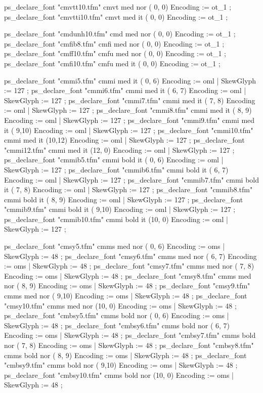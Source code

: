 {    ps_declare_font "cmvtt10.tfm"  cmvt med  nor ( 0, 0) { Encoding := ot_1 };
    ps_declare_font "cmvtti10.tfm" cmvt med  it  ( 0, 0) { Encoding := ot_1 };

    ps_declare_font "cmdunh10.tfm" cmd  med  nor ( 0, 0) { Encoding := ot_1 };
    ps_declare_font "cmfib8.tfm"   cmfi med  nor ( 0, 0) { Encoding := ot_1 };
    ps_declare_font "cmff10.tfm"   cmfu med  nor ( 0, 0) { Encoding := ot_1 };
    ps_declare_font "cmfi10.tfm"   cmfu med  it  ( 0, 0) { Encoding := ot_1 };

    ps_declare_font "cmmi5.tfm"    cmmi med  it  ( 0, 6) { Encoding := oml | SkewGlyph := 127 };
    ps_declare_font "cmmi6.tfm"    cmmi med  it  ( 6, 7) { Encoding := oml | SkewGlyph := 127 };
    ps_declare_font "cmmi7.tfm"    cmmi med  it  ( 7, 8) { Encoding := oml | SkewGlyph := 127 };
    ps_declare_font "cmmi8.tfm"    cmmi med  it  ( 8, 9) { Encoding := oml | SkewGlyph := 127 };
    ps_declare_font "cmmi9.tfm"    cmmi med  it  ( 9,10) { Encoding := oml | SkewGlyph := 127 };
    ps_declare_font "cmmi10.tfm"   cmmi med  it  (10,12) { Encoding := oml | SkewGlyph := 127 };
    ps_declare_font "cmmi12.tfm"   cmmi med  it  (12, 0) { Encoding := oml | SkewGlyph := 127 };
    ps_declare_font "cmmib5.tfm"   cmmi bold it  ( 0, 6) { Encoding := oml | SkewGlyph := 127 };
    ps_declare_font "cmmib6.tfm"   cmmi bold it  ( 6, 7) { Encoding := oml | SkewGlyph := 127 };
    ps_declare_font "cmmib7.tfm"   cmmi bold it  ( 7, 8) { Encoding := oml | SkewGlyph := 127 };
    ps_declare_font "cmmib8.tfm"   cmmi bold it  ( 8, 9) { Encoding := oml | SkewGlyph := 127 };
    ps_declare_font "cmmib9.tfm"   cmmi bold it  ( 9,10) { Encoding := oml | SkewGlyph := 127 };
    ps_declare_font "cmmib10.tfm"  cmmi bold it  (10, 0) { Encoding := oml | SkewGlyph := 127 };

    ps_declare_font "cmsy5.tfm"    cmms med  nor ( 0, 6) { Encoding := oms | SkewGlyph := 48 };
    ps_declare_font "cmsy6.tfm"    cmms med  nor ( 6, 7) { Encoding := oms | SkewGlyph := 48 };
    ps_declare_font "cmsy7.tfm"    cmms med  nor ( 7, 8) { Encoding := oms | SkewGlyph := 48 };
    ps_declare_font "cmsy8.tfm"    cmms med  nor ( 8, 9) { Encoding := oms | SkewGlyph := 48 };
    ps_declare_font "cmsy9.tfm"    cmms med  nor ( 9,10) { Encoding := oms | SkewGlyph := 48 };
    ps_declare_font "cmsy10.tfm"   cmms med  nor (10, 0) { Encoding := oms | SkewGlyph := 48 };
    ps_declare_font "cmbsy5.tfm"   cmms bold nor ( 0, 6) { Encoding := oms | SkewGlyph := 48 };
    ps_declare_font "cmbsy6.tfm"   cmms bold nor ( 6, 7) { Encoding := oms | SkewGlyph := 48 };
    ps_declare_font "cmbsy7.tfm"   cmms bold nor ( 7, 8) { Encoding := oms | SkewGlyph := 48 };
    ps_declare_font "cmbsy8.tfm"   cmms bold nor ( 8, 9) { Encoding := oms | SkewGlyph := 48 };
    ps_declare_font "cmbsy9.tfm"   cmms bold nor ( 9,10) { Encoding := oms | SkewGlyph := 48 };
    ps_declare_font "cmbsy10.tfm"  cmms bold nor (10, 0) { Encoding := oms | SkewGlyph := 48 };

}
